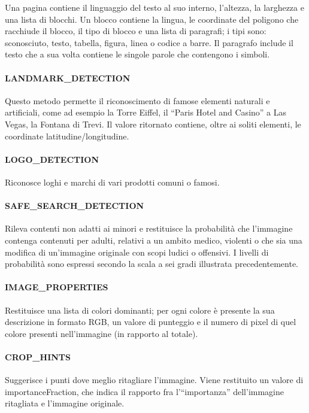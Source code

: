 Una pagina contiene il linguaggio del testo al suo interno, l'altezza, la larghezza e una lista di blocchi.
Un blocco contiene la lingua, le coordinate del poligono che racchiude il blocco, il tipo di blocco e una lista di paragrafi;
i tipi sono: sconosciuto, testo, tabella, figura, linea o codice a barre.
Il paragrafo include il testo che a sua volta contiene le singole parole che contengono i simboli.
%
\paragraph{\textsf{LANDMARK\_DETECTION}} Questo metodo permette il riconoscimento di famose elementi naturali e artificiali, come ad esempio la Torre Eiffel, il ``Paris Hotel and Casino'' a Las Vegas, la Fontana di Trevi.
Il valore ritornato contiene, oltre ai soliti elementi, le coordinate latitudine/longitudine.
%
\paragraph{\textsf{LOGO\_DETECTION}} Riconosce loghi e marchi di vari prodotti comuni o famosi.
%
\paragraph{\textsf{SAFE\_SEARCH\_DETECTION}} Rileva contenti non adatti ai minori e restituisce la probabilità che l'immagine contenga
contenuti per adulti, relativi a un ambito medico, violenti o che sia una modifica di un'immagine originale con scopi ludici o offensivi.
I livelli di probabilità sono espressi secondo la scala a sei gradi illustrata precedentemente.
%
\paragraph{\textsf{IMAGE\_PROPERTIES}} Restituisce una lista di colori dominanti; per ogni colore è presente la sua descrizione in formato RGB,
un valore di punteggio e il numero di pixel di quel colore presenti nell'immagine (in rapporto al totale).
%
\paragraph{\textsf{CROP\_HINTS}} Suggerisce i punti dove meglio ritagliare l'immagine.
Viene restituito un valore di \textsf{importanceFraction}, che indica il rapporto fra l'``importanza'' dell'immagine ritagliata e l'immagine originale.
%
